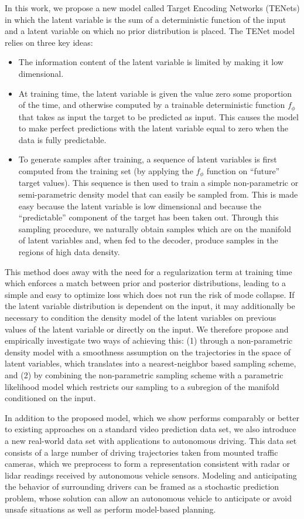 \documentclass{article}
\begin{document}
In this work, we propose a new model called Target Encoding Networks (TENets) in which the latent variable is the sum of a deterministic function of the input and a latent variable on which no prior distribution is placed.
The TENet model relies on three key ideas:
%
\begin{itemize}
  \item
    The information content of the latent variable is limited by making it low dimensional.
  \item
    At training time, the latent variable is given the value zero some proportion of the time, and otherwise computed by a trainable deterministic function $f_\phi$ that takes as input the target to be predicted as input.
    This causes the model to make perfect predictions with the latent variable equal to zero when the data is fully predictable.
  \item
    To generate samples after training, a sequence of latent variables is first computed from the training set (by applying the $f_\phi$ function on ``future'' target values).
    This sequence is then used to train a simple non-parametric or semi-parametric density model that can easily be sampled from.
    This is made easy because the latent variable is low dimensional and because the ``predictable'' component of the target has been taken out.
    Through this sampling procedure, we naturally obtain samples which are on the manifold of latent variables and, when fed to the decoder, produce samples in the regions of high data density.
\end{itemize}

This method does away with the need for a regularization term at training time which enforces a match between prior and posterior distributions, leading to a simple and easy to optimize loss which does not run the risk of mode collapse.
If the latent variable distribution is dependent on the input, it may additionally be necessary to condition the density model of the latent variables on previous values of the latent variable or directly on the input.
We therefore propose and empirically investigate two ways of achieving this:
(1) through a non-parametric density model with a smoothness assumption on the trajectories in the space of latent variables, which translates into a nearest-neighbor based sampling scheme, and
(2) by combining the non-parametric sampling scheme with a parametric likelihood model which restricts our sampling to a subregion of the manifold conditioned on the input.

In addition to the proposed model, which we show performs comparably or better to existing approaches on a standard video prediction data set, we also introduce a new real-world data set with applications to autonomous driving.
This data set consists of a large number of driving trajectories taken from mounted traffic cameras, which we preprocess to form a representation consistent with radar or lidar readings received by autonomous vehicle sensors.
Modeling and anticipating the behavior of surrounding drivers can be framed as a stochastic prediction problem, whose solution can allow an autonomous vehicle to anticipate or avoid unsafe situations as well as perform model-based planning.
\end{document}
